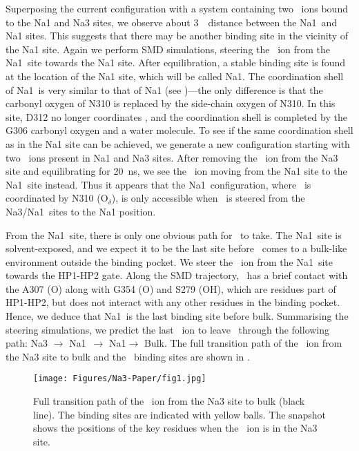 Superposing the current configuration with a system containing two \Na\ ions bound to the Na1 and 
Na3 sites, we observe about 3~\angs\ distance between the Na1\prim\ and Na1 sites. This suggests 
that there may be another binding site in the vicinity of the Na1 site. Again we perform SMD 
simulations, steering the \Na\ ion from the Na1\prim\ site towards the Na1 site. After equilibration, 
a stable binding site is found at the location of the Na1 site, which will be called Na1\dprim. The 
coordination shell of Na1\dprim\ is very similar to that of Na1 (see )---the 
only difference is that the carbonyl oxygen of N310 is replaced by the side-chain oxygen of N310. 
In this site, D312 no longer coordinates \Na, and the coordination shell is completed by the G306 
carbonyl oxygen and a water molecule. To see if the same coordination shell as in the Na1 site can 
be achieved, we generate a new configuration starting with two \Na\ ions present in Na1 and Na3 
sites. After removing the \Na\ ion from the Na3 site and equilibrating for 20~ns, we see the \Na\ 
ion moving from the Na1 site to the Na1\prim\ site instead. Thus it appears that the Na1\dprim\ 
configuration, where \Na\ is coordinated by N310 (O$_{\delta}$), is only accessible when \Na\ is 
steered from the Na3/Na1\prim\ sites to the Na1 position.

From the Na1\dprim\ site, there is only one obvious path for \Na\ to take. The Na1\dprim\ site is 
solvent-exposed, and we expect it to be the last site before \Na\ comes to a bulk-like environment 
outside the binding pocket. We steer the \Na\ ion from the Na1\dprim\ site towards the HP1-HP2 gate. 
Along the SMD trajectory, \Na\ has a brief contact with the A307 (O) along with G354 (O) and S279 (OH), 
which are residues part of HP1-HP2, but does not interact with any other residues in the binding pocket. 
Hence, we deduce that Na1\dprim\ is the last binding site before bulk. Summarising the steering 
simulations, we predict the last \Na\ ion to leave \GltPh\ through the following path: Na3 $\rightarrow$ 
Na1\prim\ $\rightarrow$ Na1\dprim $\rightarrow$ Bulk. The full transition path of the \Na\ ion from the 
Na3 site to bulk and the \Na\ binding sites are shown in \figref{na3:fig1}. 

\begin{figure}[b!]
 \centering
  \texttt{[image: Figures/Na3-Paper/fig1.jpg]}
 \caption{Full transition path of the \Na\ ion from  the  Na3 site to bulk 
(black line). The binding sites are indicated with yellow balls. The snapshot 
shows the positions of the key residues when the \Na\ ion is in the Na3 site.}
 \label{na3:fig1}
\end{figure}

